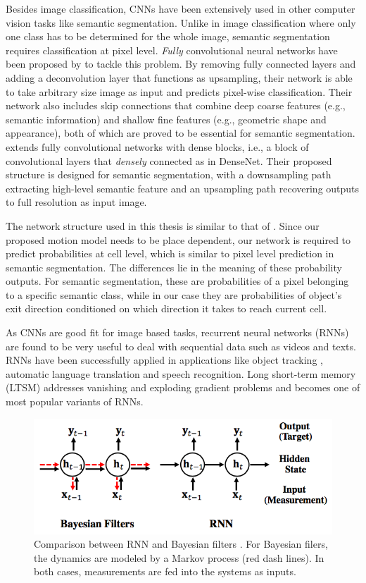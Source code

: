 Besides image classification, CNNs have been extensively used in other computer vision tasks like semantic segmentation. Unlike in image classification where only one class has to be determined for the whole image, semantic segmentation requires  classification at pixel level. \textit{Fully} convolutional neural networks have been proposed by \cite{long2015fully} to tackle this problem. By removing fully connected layers and adding a deconvolution layer that functions as upsampling, their network is able to take arbitrary size image as input and predicts pixel-wise classification. Their network also includes skip connections that combine deep coarse features (e.g., semantic information) and shallow fine features (e.g., geometric shape and appearance), both of which are proved to be essential for semantic segmentation. \citet{jegou2017one} extends fully convolutional networks with dense blocks, i.e., a block of convolutional layers that \textit{densely} connected as in DenseNet. Their proposed structure is designed for semantic segmentation, with a downsampling path extracting high-level semantic feature and an upsampling path recovering outputs to full resolution as input image. 

The network structure used in this thesis is similar to that of \citet{jegou2017one}. Since our proposed motion model needs to be place dependent, our network is required to predict probabilities at cell level, which is similar to pixel level prediction in semantic segmentation. The differences lie in the meaning of these probability outputs. For semantic segmentation, these are probabilities of a pixel belonging to a specific semantic class, while in our case they are probabilities of object's exit direction conditioned on which direction it takes to reach current cell.   

As CNNs are good fit for image based tasks, recurrent neural networks (RNNs) are found to be very useful to deal with sequential data such as videos and texts. RNNs have been successfully applied in applications like object tracking \citep{ondruska2016deep}, automatic language translation \citep{cho2014learning} and speech recognition\citep{graves2013speech}. Long short-term memory (LTSM) \citep{hochreiter1997long} addresses vanishing and exploding gradient problems and becomes one of most popular variants of RNNs. 

\begin{figure}[ht]
  \centering
    \includegraphics[width=.7\textwidth]{figures/rnn_and_bayes.png}
    \caption[Comparison between RNN and Bayesian filters.]{Comparison between RNN and Bayesian filters \citep{de2017dynamic}. For Bayesian filers, the dynamics are modeled by a Markov process (red dash lines). In both cases, measurements are fed into the systems as inputs.}
    \label{fig:rnn_and_bayes}
\end{figure} 


